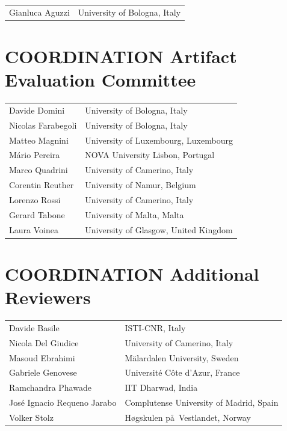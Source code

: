 \documentclass[]{llncs}
\begin{document}
\noindent
\begin{longtable}{p{}p{}}

Gianluca Aguzzi & University of Bologna, Italy

\end{longtable}

\section*{COORDINATION Artifact Evaluation Committee}

\noindent
\begin{longtable}{p{}p{}}


Davide Domini & University of Bologna, Italy\\

Nicolas Farabegoli & University of Bologna, Italy\\

Matteo Magnini & University of Luxembourg, Luxembourg\\

M\'ario Pereira & NOVA University Lisbon, Portugal\\


Marco Quadrini & University of Camerino, Italy\\

Corentin Reuther & University of Namur, Belgium\\

Lorenzo Rossi & University of Camerino, Italy\\

Gerard Tabone & University of Malta, Malta\\

Laura Voinea & University of Glasgow, United Kingdom\\

\end{longtable}


\section*{COORDINATION Additional Reviewers}
\noindent
\begin{longtable}{p{}p{}}
Davide Basile & ISTI-CNR, Italy\\
Nicola Del Giudice & University of Camerino, Italy\\
Masoud Ebrahimi & M\"alardalen University, Sweden\\
Gabriele Genovese & Universit\'e C\^ote d'Azur, France\\
Ramchandra Phawade & IIT Dharwad, India\\
Jos\'e Ignacio Requeno Jarabo & Complutense University of Madrid, Spain\\
Volker Stolz & H\o gskulen p\aa\ Vestlandet, Norway
\\
\end{longtable}
\end{document}

